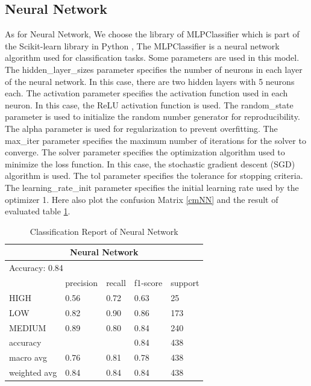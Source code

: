 \subsection{Neural Network}

As for Neural Network, We choose the library of MLPClassifier which is part of the Scikit-learn library in Python , The MLPClassifier is a neural network algorithm used for classification tasks. Some parameters are used in this model. The hidden\_layer\_sizes parameter specifies the number of neurons in each layer of the neural network. In this case, there are two hidden layers with 5 neurons each. The activation parameter specifies the activation function used in each neuron. In this case, the ReLU activation function is used. The random\_state parameter is used to initialize the random number generator for reproducibility. The alpha parameter is used for regularization to prevent overfitting. The max\_iter parameter specifies the maximum number of iterations for the solver to converge. The solver parameter specifies the optimization algorithm used to minimize the loss function. In this case, the stochastic gradient descent (SGD) algorithm is used. The tol parameter specifies the tolerance for stopping criteria. The learning\_rate\_init parameter specifies the initial learning rate used by the optimizer 1. 
Here also plot the confusion Matrix \ref*{cmNN} and the result of evaluated table \ref*{tableNN}.


\begin{table}[H]\centering
    \begin{tabular}{@{}lllll@{}}
    \toprule
    \multicolumn{5}{c}{Neural Network}                 \\ \midrule
    \multicolumn{5}{l}{Accuracy: 0.84}       \\\midrule
                 & precision & recall & f1-score & support \\
    HIGH         & 0.56      & 0.72   & 0.63     & 25      \\ 
    LOW          & 0.82      & 0.90   & 0.86     & 173     \\
    MEDIUM       & 0.89      & 0.80   & 0.84     & 240     \\
    accuracy     &           &        & 0.84     & 438     \\
    macro avg    & 0.76      & 0.81   & 0.78     & 438     \\
    weighted avg & 0.84      & 0.84   & 0.84     & 438     \\ \bottomrule
    \end{tabular}
    \caption{Classification Report of Neural Network}
    \label{tableNN}
\end{table}

